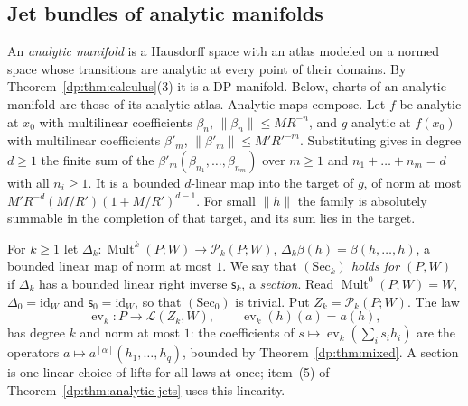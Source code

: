 \documentclass[11pt]{amsart}
\theoremstyle{definition}
\theoremstyle{remark}
\numberwithin{equation}{section}
\newcommand{\cL}{\mathcal L}
\newcommand{\Mult}{\operatorname{Mult}}
\newcommand{\id}{\mathrm{id}}
\newcommand{\norm}[1]{\lVert #1\rVert}
\theoremstyle{plain}
\theoremstyle{definition}
\theoremstyle{plain}
\newcommand{\ev}{\operatorname{ev}}
\newcommand{\cP}{\mathcal P}
\begin{document}
\subsection{Jet bundles of analytic manifolds}\label{dp:ssec:analytic-jets}

An \emph{analytic manifold} is a Hausdorff space with an atlas modeled on a normed space whose transitions are analytic at every point of their domains. By Theorem~\ref{dp:thm:calculus}(3) it is a DP manifold. Below, charts of an analytic manifold are those of its analytic atlas. Analytic maps compose. Let $f$ be analytic at $x_0$ with multilinear coefficients $\beta_n$, $\norm{\beta_n}\le MR^{-n}$, and $g$ analytic at $f(x_0)$ with multilinear coefficients $\beta'_m$, $\norm{\beta'_m}\le M'R'^{-m}$. Substituting gives in degree $d\ge1$ the finite sum of the $\beta'_m(\beta_{n_1},\dots,\beta_{n_m})$ over $m\ge1$ and $n_1+\dots+n_m=d$ with all $n_i\ge1$. It is a bounded $d$-linear map into the target of $g$, of norm at most $M'R^{-d}(M/R')(1+M/R')^{d-1}$. For small $\norm h$ the family is absolutely summable in the completion of that target, and its sum lies in the target.

For $k\ge1$ let $\Delta_k\colon\Mult^k(P;W)\to\cP_k(P;W)$, $\Delta_k\beta(h)=\beta(h,\dots,h)$, a bounded linear map of norm at most $1$. We say that \emph{$(\mathrm{Sec}_k)$ holds for $(P,W)$} if $\Delta_k$ has a bounded linear right inverse $\mathsf s_k$, a \emph{section}. Read $\Mult^0(P;W)=W$, $\Delta_0=\id_W$ and $\mathsf s_0=\id_W$, so that $(\mathrm{Sec}_0)$ is trivial. Put $Z_k=\cP_k(P;W)$. The law
\[
 \ev_k\colon P\to\cL(Z_k,W),\qquad\ev_k(h)(a)=a(h),
\]
has degree $k$ and norm at most $1$: the coefficients of $s\mapsto\ev_k(\sum_is_ih_i)$ are the operators $a\mapsto a^{[\alpha]}(h_1,\dots,h_q)$, bounded by Theorem~\ref{dp:thm:mixed}. A section is one linear choice of lifts for all laws at once; item~(5) of Theorem~\ref{dp:thm:analytic-jets} uses this linearity.
\end{document}
